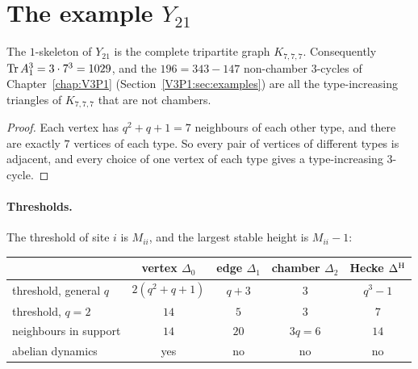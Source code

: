 \section{The example \texorpdfstring{$Y_{21}$}{Y21}}\label{V3P2:sec:example}

\begin{proposition}[$Y_{21}$ is dense]\label{V3P2:prop:k777}
The $1$-skeleton of $Y_{21}$ is the complete tripartite graph $K_{7,7,7}$. Consequently
$\operatorname{Tr} A_1^{3}=3\cdot7^{3}=1029$, and the $196=343-147$ non-chamber $3$-cycles of Chapter~\ref{chap:V3P1}
(Section~\ref{V3P1:sec:examples}) are all the type-increasing triangles of $K_{7,7,7}$ that
are not chambers.
\end{proposition}

\begin{proof}
Each vertex has $q^{2}+q+1=7$ neighbours of each other type, and there are exactly $7$
vertices of each type. So every pair of vertices of different types is adjacent, and every
choice of one vertex of each type gives a type-increasing $3$-cycle.
\end{proof}

\paragraph{Thresholds.} The threshold of site $i$ is $M_{ii}$, and the largest stable height is
$M_{ii}-1$:
\begin{center}
\begin{tabular}{lcccc}
\toprule
& vertex $\Delta_0$ & edge $\Delta_1$ & chamber $\Delta_2$ & Hecke $\Delta^{\mathrm{H}}$\\
\midrule
threshold, general $q$ & $2(q^{2}+q+1)$ & $q+3$ & $3$ & $q^{3}-1$\\
threshold, $q=2$ & $14$ & $5$ & $3$ & $7$\\
neighbours in support & $14$ & $20$ & $3q=6$ & $14$\\
abelian dynamics & yes & no & no & no\\
\bottomrule
\end{tabular}
\end{center}

